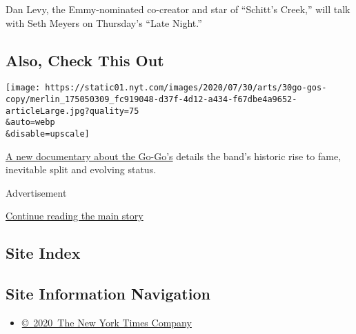Dan Levy, the Emmy-nominated co-creator and star of ``Schitt's Creek,''
will talk with Seth Meyers on Thursday's ``Late Night.''

\hypertarget{also-check-this-out}{%
\subsection{Also, Check This Out}\label{also-check-this-out}}

\texttt{[image: https://static01.nyt.com/images/2020/07/30/arts/30go-gos-copy/merlin\_175050309\_fc919048-d37f-4d12-a434-f67dbe4a9652-articleLarge.jpg?quality=75\\\&auto=webp\\\&disable=upscale]}

\href{https://www.nytimes.com/2020/07/29/arts/music/the-go-gos-documentary.html}{A
new documentary about the Go-Go's} details the band's historic rise to
fame, inevitable split and evolving status.

Advertisement

\protect\hyperlink{after-bottom}{Continue reading the main story}

\hypertarget{site-index}{%
\subsection{Site Index}\label{site-index}}

\hypertarget{site-information-navigation}{%
\subsection{Site Information
Navigation}\label{site-information-navigation}}

\begin{itemize}
\tightlist
\item
  \href{https://help.nytimes.com/hc/en-us/articles/115014792127-Copyright-notice}{©~2020~The
  New York Times Company}
\end{itemize}

